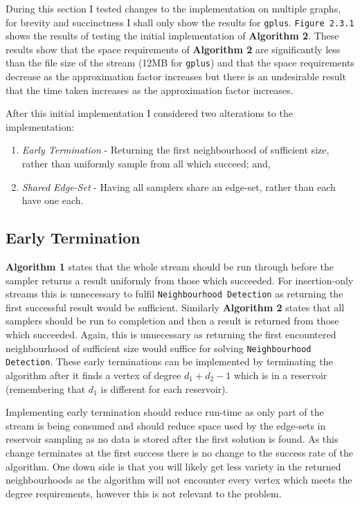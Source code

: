 \documentclass[11pt,twoside,a4paper]{report}
\begin{document}
\par During this section I tested changes to the implementation on multiple graphs, for brevity and succinctness I shall only show the results for \texttt{gplus}. \texttt{Figure 2.3.1} shows the results of testing the initial implementation of \textbf{Algorithm 2}. These results show that the space requirements of \textbf{Algorithm 2} are significantly less than the file size of the stream (12MB for \texttt{gplus}) and that the space requirements decrease as the approximation factor increases but there is an undesirable result that the time taken increases as the approximation factor increases.

\par After this initial implementation I considered two alterations to the implementation:
\begin{enumerate}
	\item \textit{Early Termination} - Returning the first neighbourhood of sufficient size, rather than uniformly sample from all which succeed; and,
	\item \textit{Shared Edge-Set} - Having all samplers share an edge-set, rather than each have one each.
\end{enumerate}

\subsection{Early Termination}

\textbf{Algorithm 1} states that the whole stream should be run through before the sampler returns a result uniformly from those which succeeded. For insertion-only streams this is unnecessary to fulfil \texttt{Neighbourhood Detection} as returning the first successful result would be sufficient. Similarly \textbf{Algorithm 2} states that all samplers should be run to completion and then a result is returned from those which succeeded. Again, this is unnecessary as returning the first encountered neighbourhood of sufficient size would suffice for solving \texttt{Neighbourhood Detection}. These early terminations can be implemented by terminating the algorithm after it finds a vertex of degree $d_1+d_2-1$ which is in a reservoir (remembering that $d_1$ is different for each reservoir).

\par Implementing early termination should reduce run-time as only part of the stream is being consumed and should reduce space used by the edge-sets in reservoir sampling as no data is stored after the first solution is found. As this change terminates at the first success there is no change to the success rate of the algorithm. One down side is that you will likely get less variety in the returned neighbourhoods as the algorithm will not encounter every vertex which meets the degree requirements, however this is not relevant to the problem.
\end{document}
